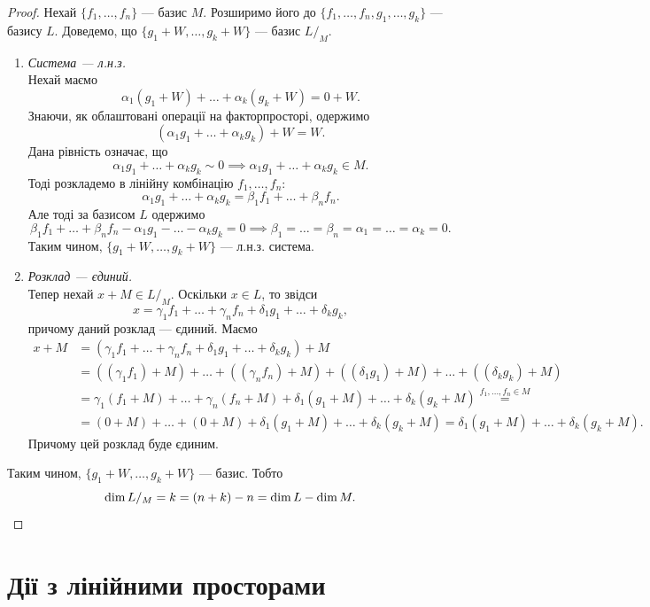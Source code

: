 \documentclass{math_library}
\begin{document}
	\begin{proof}
	Нехай $\{f_1,\dots,f_n\}$ --- базис $M$. Розширимо його до $\{f_1,\dots,f_n,g_1,\dots,g_k\}$ --- базису $L$. Доведемо, що $\{g_1+W,\dots,g_k+W\}$ --- базис $L/_{M}$.
	\begin{enumerate}[wide=0pt,label={\Roman*.}]
	\item \textit{Система --- л.н.з.}\\
	Нехай маємо
	\[
	\alpha_1 (g_1+W) + \dots + \alpha_k (g_k+W) = 0+W.
	\]
	Знаючи, як облаштовані операції на факторпросторі, одержимо
	\[
	(\alpha_1g_1+\dots+\alpha_kg_k)+W = W.
	\]
	Дана рівність означає, що
	\[
	\alpha_1g_1 + \dots + \alpha_k g_k \sim 0 \implies \alpha_1g_1 + \dots + \alpha_k g_k \in M.
	\]
	Тоді розкладемо в лінійну комбінацію $f_1,\dots,f_n$:
	\[
	\alpha_1 g_1 + \dots + \alpha_k g_k = \beta_1 f_1 + \dots + \beta_n f_n.
	\]
	Але тоді за базисом $L$ одержимо
	\[
	\beta_1 f_1 + \dots + \beta_n f_n - \alpha_1 g_1 - \dots - \alpha_k g_k = 0 \implies \beta_1 = \dots = \beta_n = \alpha_1 = \dots = \alpha_k = 0.
	\]
	Таким чином, $\{g_1+W,\dots,g_k+W\}$ --- л.н.з. система.
	
	\item \textit{Розклад --- єдиний.}\\
	Тепер нехай $x+M \in L/_{M}$. Оскільки $x \in L$, то звідси 
	\[
	x = \gamma_1 f_1 + \dots + \gamma_n f_n + \delta_1 g_1 + \dots + \delta_k g_k,
	\]
	причому даний розклад  --- єдиний. Маємо
	\begin{align*}
	x+M & = (\gamma_1 f_1 + \dots + \gamma_n f_n + \delta_1 g_1 + \dots + \delta_k g_k)+M \\
	& = ((\gamma_1 f_1) + M) + \dots + ((\gamma_n f_n) + M) + ((\delta_1 g_1) + M) + \dots + ((\delta_k g_k) + M) \\ 
	& = \gamma_1 (f_1 + M) + \dots + \gamma_n (f_n+M) + \delta_1 (g_1 + M) + \dots + \delta_k (g_k + M) \overset{f_1,\dots,f_n \in M}{=} \\ & = (0+M) + \dots + (0+M) + \delta_1 (g_1+M) + \dots + \delta_k (g_k+M) = \delta_1 (g_1+M) + \dots + \delta_k (g_k+M).
	\end{align*} 
	Причому цей розклад буде єдиним.
	\end{enumerate}
	Таким чином, $\{g_1+W,\dots,g_k+W\}$ --- базис. Тобто 
	\[
	\dim L/_{M} = k = (n+k) - n = \dim L - \dim M. \qedhere
	\]
	\end{proof}
	\newpage	
	
	

	\section{Дії з лінійними просторами}
\end{document}

